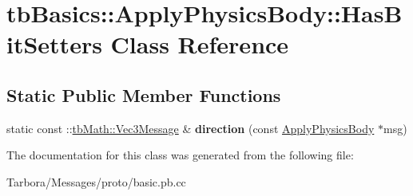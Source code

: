 \hypertarget{classtbBasics_1_1ApplyPhysicsBody_1_1HasBitSetters}{}\section{tb\+Basics\+:\+:Apply\+Physics\+Body\+:\+:Has\+Bit\+Setters Class Reference}
\label{classtbBasics_1_1ApplyPhysicsBody_1_1HasBitSetters}
\subsection*{Static Public Member Functions}
\begin{DoxyCompactItemize}
\item 
\mbox{\label{classtbBasics_1_1ApplyPhysicsBody_1_1HasBitSetters_a547b53100931f5642cee5f72be14c11a}} 
static const \+::\hyperlink{classtbMath_1_1Vec3Message}{tb\+Math\+::\+Vec3\+Message} \& {\bfseries direction} (const \hyperlink{classtbBasics_1_1ApplyPhysicsBody}{Apply\+Physics\+Body} $\ast$msg)
\end{DoxyCompactItemize}


The documentation for this class was generated from the following file\+:\begin{DoxyCompactItemize}
\item 
Tarbora/\+Messages/proto/basic.\+pb.\+cc\end{DoxyCompactItemize}
